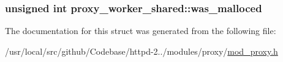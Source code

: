 \subsubsection[{\texorpdfstring{was\+\_\+malloced}{was_malloced}}]{\setlength{\rightskip}{0pt plus 5cm}unsigned {\bf int} proxy\+\_\+worker\+\_\+shared\+::was\+\_\+malloced}\hypertarget{structproxy__worker__shared_a52212ee9b0e0217ce6d8a0a29261b7ec}{}\label{structproxy__worker__shared_a52212ee9b0e0217ce6d8a0a29261b7ec}


The documentation for this struct was generated from the following file\+:\begin{DoxyCompactItemize}
\item 
/usr/local/src/github/\+Codebase/httpd-\/2../modules/proxy/\hyperlink{mod__proxy_8h}{mod\+\_\+proxy.\+h}\end{DoxyCompactItemize}
